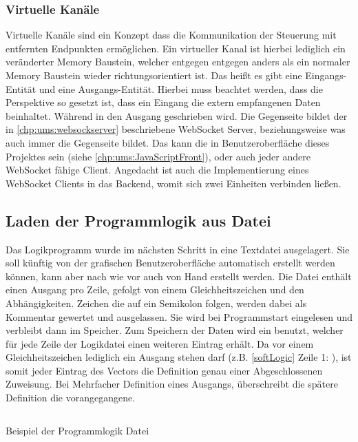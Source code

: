 \subsubsection{Virtuelle Kanäle}\label{kap:ums:virtualchannel}
Virtuelle Kanäle sind ein Konzept dass die Kommunikation der Steuerung mit entfernten Endpunkten ermöglichen. Ein virtueller Kanal ist hierbei lediglich ein veränderter Memory Baustein, welcher entgegen entgegen anders als ein normaler Memory Baustein wieder richtungsorientiert ist. Das heißt es gibt eine Eingangs-Entität und eine Ausgangs-Entität. Hierbei muss beachtet werden, dass die Perspektive so gesetzt ist, dass ein Eingang die extern empfangenen Daten beinhaltet. Während in den Ausgang geschrieben wird. Die Gegenseite bildet der in \autoref{chp:ums:websockserver} beschriebene WebSocket Server, beziehungsweise was auch immer die Gegenseite bildet. Das kann die in Benutzeroberfläche dieses Projektes sein (siehe \autoref{chp:ums:JavaScriptFront}), oder auch jeder andere WebSocket fähige Client. Angedacht ist auch die Implementierung eines WebSocket Clients in das Backend, womit sich zwei Einheiten verbinden ließen. 


\subsection{Laden der Programmlogik aus Datei}\label{kap:ums:logicOutsource}
Das Logikprogramm wurde im nächsten Schritt in eine Textdatei ausgelagert. Sie soll künftig von der grafischen Benutzeroberfläche automatisch erstellt werden können, kann aber nach wie vor auch von Hand erstellt werden. Die Datei enthält einen Ausgang pro Zeile, gefolgt von einem Gleichheitszeichen und den Abhängigkeiten. Zeichen die auf ein Semikolon folgen, werden dabei als Kommentar gewertet und ausgelassen. Sie wird bei Programmstart eingelesen und verbleibt dann im Speicher. Zum Speichern der Daten wird ein  benutzt, welcher für jede Zeile der Logikdatei einen weiteren Eintrag erhält. Da vor einem Gleichheitszeichen lediglich ein Ausgang stehen darf (z.B. \ref{softLogic} Zeile 1: ), ist somit jeder Eintrag des Vectors die Definition genau einer Abgeschlossenen Zuweisung. Bei Mehrfacher Definition eines Ausgangs, überschreibt die spätere Definition die vorangegangene. 

\begin{listing}[H]
	\inputminted[numbersep=1pt,fontsize=\scriptsize,frame=single, firstline=29,lastline=36]{c}{./code/logic.conf}
	\caption{Beispiel der Programmlogik Datei}
	\label{code:softLogic}
\end{listing}


